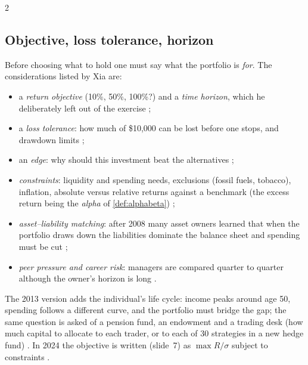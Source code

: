 \begin{paracol}{2}
\subsection{Objective, loss tolerance, horizon}
Before choosing what to hold one must say what the portfolio is \emph{for}. The considerations listed by Xia are:
\begin{itemize}
  \item a \emph{return objective} (10\%, 50\%, 100\%?) and a \emph{time horizon}, which he deliberately left out
        of the exercise ;
  \item a \emph{loss tolerance}: how much of \$10{,}000 can be lost before one stops, and drawdown limits
        ;
  \item an \emph{edge}: why should this investment beat the alternatives ;
  \item \emph{constraints}: liquidity and spending needs, exclusions (fossil fuels, tobacco), inflation, absolute
        versus relative returns against a benchmark (the excess return being the \emph{alpha} of
        \cref{def:alphabeta}) ;
  \item \emph{asset--liability matching}: after 2008 many asset owners learned that when the portfolio draws down
        the liabilities dominate the balance sheet and spending must be cut ;
  \item \emph{peer pressure and career risk}: managers are compared quarter to quarter although the owner's
        horizon is long .
\end{itemize}
The 2013 version adds the individual's life cycle: income peaks around age 50, spending follows a different
curve, and the portfolio must bridge the gap; the same question is asked of a pension fund, an endowment and a
trading desk (how much capital to allocate to each trader, or to each of 30 strategies in a new hedge fund)
.
In 2024 the objective is written (slide~7) as $\max R/\sigma$ subject to constraints .


\end{paracol}
